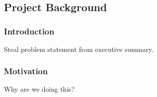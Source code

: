 \subsection{Project Background}
\subsubsection*{Introduction}
Steal problem statement from executive summary.
\subsubsection*{Motivation}
Why are we doing this?